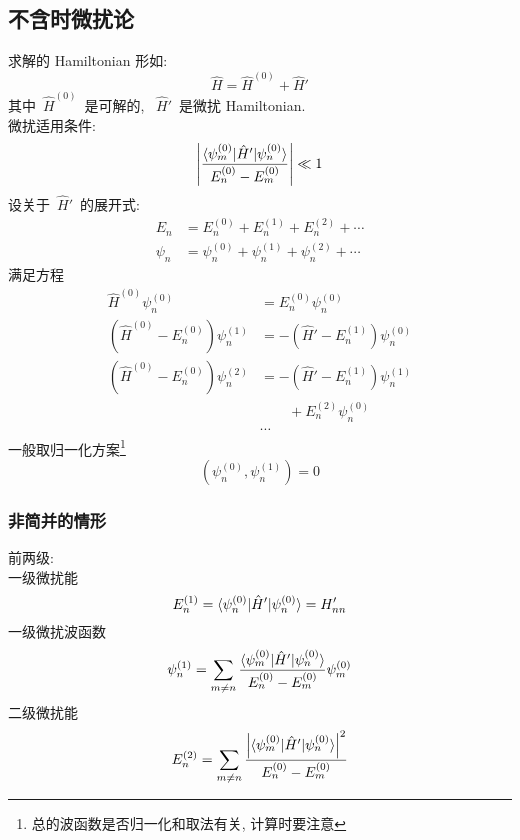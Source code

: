 \documentclass[11pt,a4paper,twocolumn,fleqn]{article}%
\renewcommand{\[}{~$}
\renewcommand{\]}{$~}%
\begin{document}
	\subsection{不含时微扰论}
	求解的 Hamiltonian 形如: 
	\begin{equation}
	 \hat H = \hat H^{(0)} + \hat H'
	\end{equation}
	其中\[\hat H^{(0)}\]是可解的, \[\hat H'\]是微扰 Hamiltonian.\\
	微扰适用条件:
	\begin{equation}
	 \left|\frac{\braket{\psi_m^{(0)}|\hat H'|\psi_n^{(0)}}}{E_n^{(0)}- E_m^{(0)}}\right|\ll 1
	\end{equation}
	设关于\[\hat H'\]的展开式:
	\begin{align}
	 E_n &= E_n^{(0)} + E_n^{(1)} + E_n^{(2)} + \cdots \\
	 \psi_n &= \psi_n^{(0)} + \psi_n^{(1)} + \psi_n^{(2)} + \cdots
	\end{align}
	满足方程
	\begin{align}
	 \hat H^{(0)}\psi_n^{(0)} &= E_n^{(0)}\psi_n^{(0)} \\
	 (\hat H^{(0)} - E_n^{(0)})\psi_n^{(1)} &= -(\hat H' - E_n^{(1)})\psi_n^{(0)} \\
	 (\hat H^{(0)} - E_n^{(0)})\psi_n^{(2)} &= -(\hat H' - E_n^{(1)})\psi_n^{(1)} \nonumber \\
	 &\qquad + E_n^{(2)}\psi_n^{(0)} \\
	 &\cdots \nonumber
	\end{align}
	一般取归一化方案\footnote{总的波函数是否归一化和取法有关, 计算时要注意}
	\begin{equation}
	 (\psi_n^{(0)},\psi_n^{(1)}) = 0
	\end{equation}
	\subsubsection{非简并的情形}
	前两级:\\
	一级微扰能
	\begin{equation}
	 E_n^{(1)} = \braket{\psi_n^{(0)}|\hat H'|\psi_n^{(0)}} = H'_{nn}
	\end{equation}
	一级微扰波函数
	\begin{equation}
	 \psi_n^{(1)} = \sum_{m\neq n}\frac{\braket{\psi_m^{(0)}|\hat H'|\psi_n^{(0)}}}{E_n^{(0)} - E_m^{(0)}}\psi_m^{(0)}
	\end{equation}
	二级微扰能
	\begin{equation}
	 E_n^{(2)} = \sum_{m\neq n}\frac{\left|\braket{\psi_m^{(0)}|\hat H'|\psi_n^{(0)}}\right|^2}{E_n^{(0)} - E_m^{(0)}}
	\end{equation}
\end{document}
